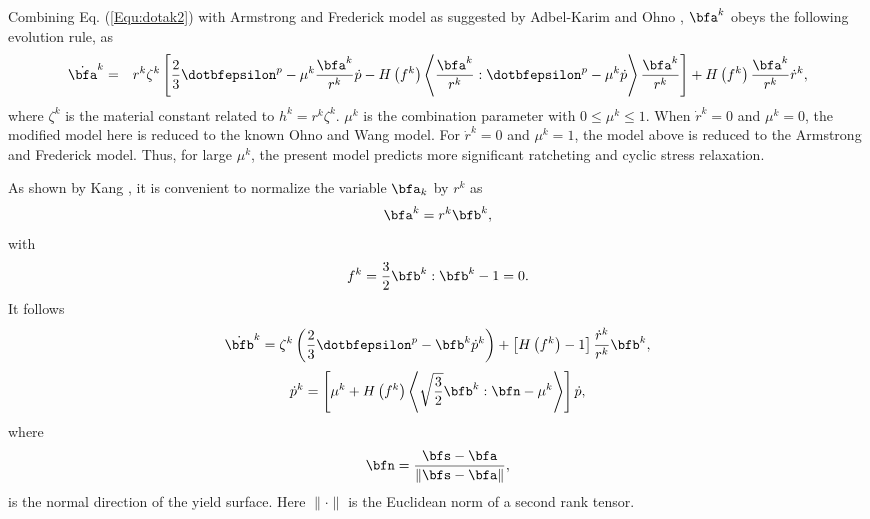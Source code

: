 Combining Eq. (\ref{Equ:dotak2}) with Armstrong and Frederick model as suggested by Adbel-Karim and Ohno  \cite{AbdelKarim20051303},  ${\bfa^k}$ obeys the following evolution rule, as
\begin{eqnarray}
\label{Equ:dotak3}
{\dot\bfa^k} &=& {r^k}{\zeta ^k}\left[ \frac{2}{3}{{\dotbfepsilon}^p} - {\mu ^k}\frac{\bfa^k}{r^k}\dot p - H\left( {f^k} \right) \left\langle {\frac{\bfa^k}{r^k}:{\dotbfepsilon}^p} - {\mu ^k}\dot p \right\rangle \frac{\bfa^k}{r^k} \right]
+ H\left( {f^k} \right)\frac{\bfa^k}{r^k}{\dot r^k},
\end{eqnarray}
where ${\zeta ^k}$ is the material constant related to ${h^k} = {r^k}{\zeta ^k}$. ${\mu ^k}$ is the combination parameter with $0 \leqslant {\mu ^k} \leqslant 1$. When ${\dot r^k} = 0$ and ${\mu ^k} = 0$, the modified model here is reduced to the known Ohno and Wang model. For ${\dot r^k} = 0$ and ${\mu ^k} = 1$, the  model above is reduced to the Armstrong and Frederick model. Thus, for large ${\mu ^k}$, the present model predicts more significant ratcheting and cyclic stress relaxation.

As shown by Kang \cite{Kang2004299}, it is convenient to normalize the variable $\bfa_k$ by $r^k$ as
\begin{equation}
\label{Equ:ak1}
{\bfa^k} = {r^k}{\bfb^k},
\end{equation}
with
\begin{equation}
{f^k} = \frac{3}{2}{\bfb^k}:{\bfb^k} - 1 = 0.
\end{equation}
It follows
\begin{equation}
{\dot\bfb^k} = {\zeta ^k}\left( {\frac{2}{3}{\dotbfepsilon^p} - {\bfb^k}{{\dot p}^k}} \right) + \left[ {H\left( {{f^k}} \right) - 1} \right]\frac{{{{\dot r}^k}}}{{{r^k}}}{\bfb^k},
\end{equation}
\begin{equation}
{\dot p^k} = \left[ {{\mu ^k} + H\left( {{f^k}} \right)\left\langle {\sqrt {\frac{3}{2}} {\bfb^k}:\bfn - {\mu ^k}} \right\rangle } \right]\dot p,
\end{equation}
where
\begin{equation}
\bfn = \frac{{\bfs - \bfa}}{{\left\| {\bfs - \bfa} \right\|}},
\end{equation}
is the normal direction of the yield surface. Here $\parallel\cdot\parallel$ is the Euclidean norm of a second rank tensor.


